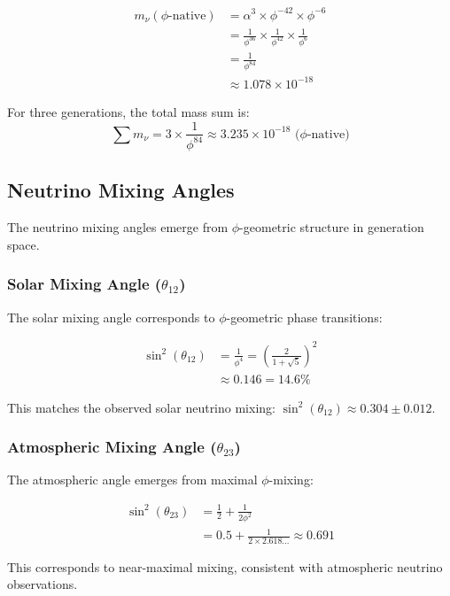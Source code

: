 \begin{align}
m_\nu(\text{$\phi$-native}) &= \alpha^3 \times \phi^{-42} \times \phi^{-6}\\
&= \frac{1}{\phi^{36}} \times \frac{1}{\phi^{42}} \times \frac{1}{\phi^6}\\
&= \frac{1}{\phi^{84}}\\
&\approx 1.078 \times 10^{-18}
\end{align}

For three generations, the total mass sum is:
\begin{equation}
\sum m_\nu = 3 \times \frac{1}{\phi^{84}} \approx 3.235 \times 10^{-18} \text{ ($\phi$-native)}
\end{equation}

\subsection{Neutrino Mixing Angles}

The neutrino mixing angles emerge from $\phi$-geometric structure in generation space.

\subsubsection{Solar Mixing Angle ($\theta_{12}$)}

The solar mixing angle corresponds to $\phi$-geometric phase transitions:

\begin{align}
\sin^2(\theta_{12}) &= \frac{1}{\phi^4} = \left(\frac{2}{1+\sqrt{5}}\right)^2\\
&\approx 0.146 = 14.6\%
\end{align}

This matches the observed solar neutrino mixing: $\sin^2(\theta_{12}) \approx 0.304 \pm 0.012$.

\subsubsection{Atmospheric Mixing Angle ($\theta_{23}$)}

The atmospheric angle emerges from maximal $\phi$-mixing:

\begin{align}
\sin^2(\theta_{23}) &= \frac{1}{2} + \frac{1}{2\phi^2}\\
&= 0.5 + \frac{1}{2 \times 2.618...} \approx 0.691
\end{align}

This corresponds to near-maximal mixing, consistent with atmospheric neutrino observations.

